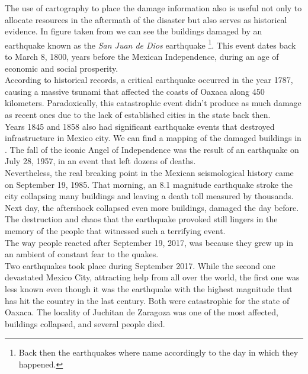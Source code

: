 The use of cartography to place the damage information also is useful not only to allocate resources in the aftermath of the disaster but also serves as historical evidence. In figure \cite{fig:quake1800} taken from \cite{AG3316} we can see the buildings damaged by an earthquake known as the \textit{San Juan de Dios} earthquake \footnote{Back then the earthquakes where name accordingly to the day in which they happened.}. This event dates back to March 8, 1800, years before the Mexican Independence, during an age of economic and social prosperity.\\

According to historical records, a critical earthquake occurred in the year 1787, causing a massive tsunami that affected the coasts of Oaxaca along 450 kilometers. Paradoxically, this catastrophic event didn't produce as much damage as recent ones due to the lack of established cities in the state back then.\\

Years 1845 and 1858 also had significant earthquake events that destroyed infrastructure in Mexico city. We can find a mapping of the damaged buildings in \cite{AG3316}. The fall of the iconic Angel of Independence was the result of an earthquake on July 28, 1957, in an event that left dozens of deaths.\\

Nevertheless, the real breaking point in the Mexican seismological history came on September 19, 1985. That morning, an 8.1 magnitude earthquake stroke the city collapsing many buildings and leaving a death toll measured by thousands. Next day, the aftershock collapsed even more buildings, damaged the day before. The destruction and chaos that the earthquake provoked still lingers in the memory of the people that witnessed such a terrifying event.\\

The way people reacted after September 19, 2017, was because they grew up in an ambient of constant fear to the quakes.\\

Two earthquakes took place during September 2017. While the second one devastated Mexico City, attracting help from all over the world, the first one was less known even though it was the earthquake with the highest magnitude that has hit the country in the last century. Both were catastrophic for the state of Oaxaca. The locality of Juchitan de Zaragoza was one of the most affected, buildings collapsed, and several people died.\\


